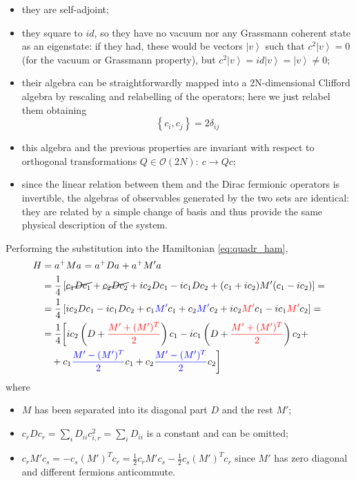 \documentclass[a4paper,11pt]{article}
\theoremstyle{remark}
\newcommand{\ket}[1]{\left | #1 \right \rangle}
\newcommand{\nl}{\vskip 0.3cm}
\newcommand*{\mathcolor}{}  %
\def\mathcolor#1#{\mathcoloraux{#1}}
\newcommand*{\mathcoloraux}[3]{%
  \protect\leavevmode
  \begingroup
    \color#1{#2}#3%
  \endgroup
}
\begin{document}
   \begin{itemize}
   \item they are self-adjoint;
   \item they square to $id$, so they have no vacuum nor any Grassmann coherent state as an eigenstate: if they had, these would be vectors $\ket{v}$ such that $c^2\ket{v}=0$ (for the vacuum or Grassmann property), but $c^2\ket{v}=id\ket{v}=\ket{v}\neq 0$;
   \item their algebra can be straightforwardly mapped into a 2N-dimensional Clifford algebra by rescaling and relabelling of the operators; here we just relabel them obtaining 
   \begin{equation}
    \left\{c_{i},c_{j}\right\} = 2\delta_{ij}
    \label{eq:algebra_majorana}
   \end{equation}
   \item this algebra and the previous properties are invariant with respect to orthogonal transformations $Q\in\mathcal{O}(2N):\ c\rightarrow Qc$;
   \item since the linear relation between them and the Dirac fermionic operators is invertible, the algebras of observables generated by the two sets are identical: they are related by a simple change of basis and thus provide the same physical description of the system.
   \end{itemize}
   Performing the substitution into the Hamiltonian \ref{eq:quadr_ham},
    \begin{align*}
     H &= a^+Ma^{ } = a^+Da^{ } + a^+M'a^{ }\notag\\
       &=\frac{1}{4}\left[\cancel{c_1Dc_1} + \cancel{c_2Dc_2} +ic_2Dc_1-ic_1Dc_2+(c_1+ic_2)M'(c_1-ic_2)\right] =  \notag\\
       &=\frac{1}{4}\left[ic_2Dc_1-ic_1Dc_2+c_1\mathcolor{blue}{M'}c_1 + c_2\mathcolor{blue}{M'}c_2 +ic_2\mathcolor{red}{M'}c_1-ic_1\mathcolor{red}{M'}c_2\right]=\notag \\
       &=\frac{1}{4}\bigg[ic_2\left(D+\mathcolor{red}{\frac{M'+(M')^T}{2}}\right)c_1-ic_1\left(D+\mathcolor{red}{\frac{M'+(M')^T}{2}}\right)c_2 +\notag\\
       &\ \ \ +c_1\mathcolor{blue}{\frac{M'-(M')^T}{2}}c_1+c_2\mathcolor{blue}{\frac{M'-(M')^T}{2}}c_2\bigg]\notag
    \end{align*}
    where \begin{itemize}
           \item $M$ has been separated into its diagonal part $D$ and the rest $\displaystyle M'$;
           \item $c_rDc_r = \sum_iD_{ii}c_{i,r}^2 = \sum_i D_{ii}$ is a constant and can be omitted;
           \item $\displaystyle c_rM'c_s = - c_s(M')^Tc_r = \frac{1}{2}c_rM'c_s - \frac{1}{2}c_s(M')^Tc_r$ since $M'$ has zero diagonal and different fermions anticommute.\nl
          \end{itemize}
\end{document}
